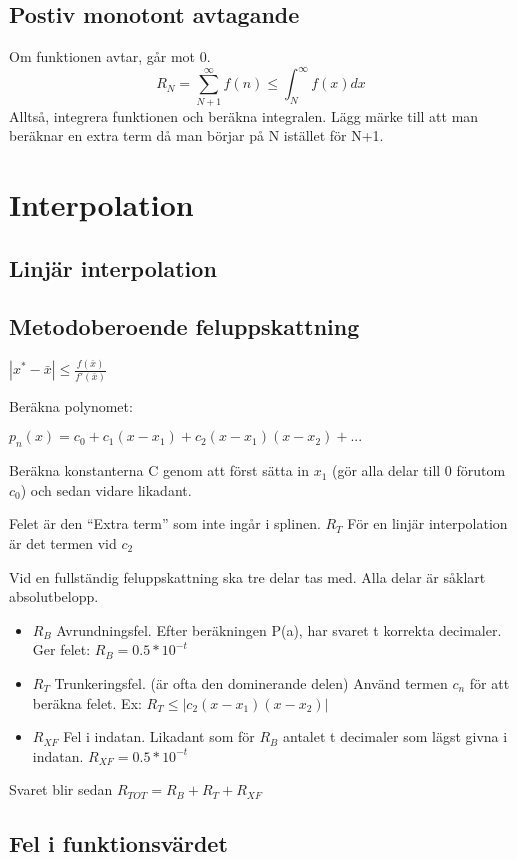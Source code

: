 \documentclass[12pt,a4paper]{article}
\begin{document}
\subsection{Postiv monotont avtagande}
Om funktionen avtar, går mot 0.
$$ R_N = \sum_{N+1}^{\infty} f(n) \leq \int_{N}^{\infty} f(x) dx $$
Alltså, integrera funktionen och beräkna integralen.
Lägg märke till att man beräknar en extra term då man börjar på N istället för N+1.


\section{Interpolation}
\subsection{Linjär interpolation}
\subsection{Metodoberoende feluppskattning}
$|x^{*}-\bar{x}| \leq \frac{f(\bar{x})}{f'(\bar{x})} $

Beräkna polynomet:

$p_n(x) = c_0 + c_1(x-x_1) + c_2 (x-x_1)(x-x_2) + ...$

Beräkna konstanterna C genom att först sätta in $x_1$ (gör alla delar till 0 förutom $c_0$) och sedan vidare likadant.

Felet är den ``Extra term'' som inte ingår i splinen. $R_T$
För en linjär interpolation är det termen vid $c_2$

Vid en fullständig feluppskattning ska tre delar tas med.
Alla delar är såklart absolutbelopp.

\begin{itemize}
\item{$R_B$ Avrundningsfel.
Efter beräkningen P(a), har svaret t korrekta decimaler. \\Ger felet: $ R_B = 0.5 * 10^{-t}$}
\item{$R_T$ Trunkeringsfel.
(är ofta den dominerande delen)
Använd termen $c_n$ för att beräkna felet.
Ex: $ R_T \leq |c_2 (x-x_1)(x-x_2)|$
}
\item{$R_{XF}$ Fel i indatan.
Likadant som för $R_B$ antalet t decimaler som lägst givna i indatan.
$R_{XF} = 0.5 * 10^{-t}$}
\end{itemize}

Svaret blir sedan $R_{TOT} = R_B + R_T + R_{XF}$

\subsection{Fel i funktionsvärdet}
\end{document}

